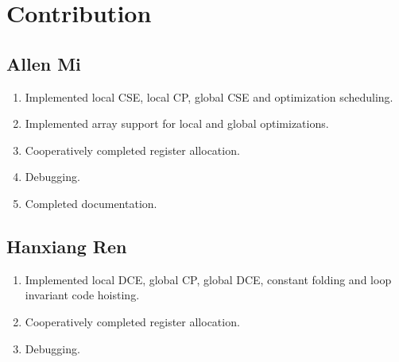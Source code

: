 \section{Contribution}

\subsection{Allen Mi}
\begin{enumerate}
    \item Implemented local CSE, local CP, global CSE and optimization scheduling.
    \item Implemented array support for local and global optimizations.
    \item Cooperatively completed register allocation.
    \item Debugging.
    \item Completed documentation.
\end{enumerate}

\subsection{Hanxiang Ren}
\begin{enumerate}
    \item Implemented local DCE, global CP, global DCE, constant folding and loop invariant code hoisting.
    \item Cooperatively completed register allocation.
    \item Debugging.
\end{enumerate}


